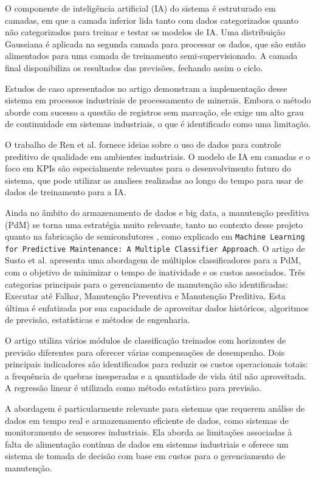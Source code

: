 O componente de inteligência artificial (IA) do sistema é estruturado em camadas, em que a camada inferior lida tanto com dados categorizados quanto não categorizados para treinar e testar os modelos de IA. Uma distribuição Gaussiana é aplicada na segunda camada para processar os dados, que são então alimentados para uma camada de treinamento semi-supervisionado. A camada final disponibiliza os resultados das previsões, fechando assim o ciclo.

Estudos de caso apresentados no artigo demonstram a implementação desse sistema em processos industriais de processamento de minerais. Embora o método aborde com sucesso a questão de registros sem marcação, ele exige um alto grau de continuidade em sistemas industriais, o que é identificado como uma limitação.

O trabalho de Ren et al. fornece ideias sobre o uso de dados para controle preditivo de qualidade em ambientes industriais. O modelo de IA em camadas e o foco em KPIs são especialmente relevantes para o desenvolvimento futuro do sistema, que pode utilizar as analises realizadas ao longo do tempo para usar de dados de treinamento para a IA.


Ainda no âmbito do armazenamento de dados e big data, a manutenção preditiva (PdM) se torna uma estratégia muito relevante, tanto no contexto desse projeto quanto na fabricação de semicondutores \cite{susto2015machine}, como explicado em \texttt{Machine Learning for Predictive Maintenance: A Multiple Classifier Approach}. O artigo de Susto et al.\cite{susto2015machine} apresenta uma abordagem de múltiplos classificadores para a PdM, com o objetivo de minimizar o tempo de inatividade e os custos associados. Três categorias principais para o gerenciamento de manutenção são identificadas: Executar até Falhar, Manutenção Preventiva e Manutenção Preditiva. Esta última é enfatizada por sua capacidade de aproveitar dados históricos, algoritmos de previsão, estatísticas e métodos de engenharia.

O artigo utiliza vários módulos de classificação treinados com horizontes de previsão diferentes para oferecer várias compensações de desempenho. Dois principais indicadores são identificados para reduzir os custos operacionais totais: a frequência de quebras inesperadas e a quantidade de vida útil não aproveitada. A regressão linear é utilizada como método estatístico para previsão.

A abordagem é particularmente relevante para sistemas que requerem análise de dados em tempo real e armazenamento eficiente de dados, como sistemas de monitoramento de sensores industriais. Ela aborda as limitações associadas à falta de alimentação contínua de dados em sistemas industriais e oferece um sistema de tomada de decisão com base em custos para o gerenciamento de manutenção.

